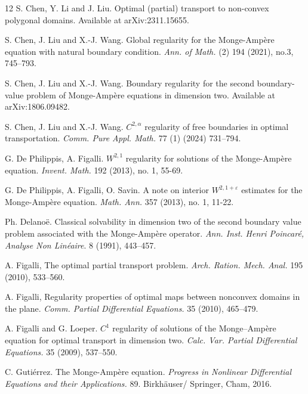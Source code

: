 \documentclass[11pt]{amsart}
\theoremstyle{plain}
\newcommand{\eps}{\varepsilon}
\newcommand{\0}{\textbf{0}}
\numberwithin{equation}{section}
\numberwithin{equation}{section}
\numberwithin{figure}{section}
\begin{document}
\begin{thebibliography}{12}
	S. Chen, Y. Li and J. Liu. Optimal (partial) transport to non-convex polygonal domains. Available at arXiv:2311.15655.
	
	S. Chen, J. Liu and X.-J. Wang. 
	Global regularity for the Monge-Amp\`ere equation with natural boundary condition. \emph{Ann. of Math.} (2) 194 (2021), no.3, 745--793.
	
	S. Chen, J. Liu and X.-J. Wang. 
	Boundary regularity for the second boundary-value problem of Monge-Amp\`ere equations in dimension two. Available at arXiv:1806.09482.
	
	S. Chen, J. Liu and X.-J. Wang.
	$C^{2,\alpha}$ regularity of free boundaries in optimal transportation.  
	\emph{Comm. Pure Appl. Math.} 77 (1) (2024) 731–794.
	
	G. De Philippis, A. Figalli.
	$W^{2,1}$ regularity for solutions of the Monge-Amp\`ere equation. \emph{Invent. Math.} 192 (2013), no. 1, 55-69.
	
	G. De Philippis, A. Figalli, O. Savin.
	A note on interior $W^{2,1+\eps}$ estimates for the Monge-Amp\`ere equation. \emph{Math. Ann.} 357 (2013), no. 1, 11-22.
	
	 Ph. Delano\"e.
	Classical solvability in dimension two of the second boundary value problem associated with the Monge-Amp\`ere operator.
	\textit{Ann. Inst. Henri Poincar\'e, Analyse Non Lin\'eaire}. 8 (1991), 443--457. 
	
	 A. Figalli, The optimal partial transport problem. 
	\textit{Arch. Ration. Mech. Anal.} 195 (2010), 533--560.
	
	
	A. Figalli, Regularity properties of optimal maps between nonconvex domains in the plane.
	\textit{Comm. Partial Differential Equations.} 35 (2010), 465--479.
	
	
	
	 A. Figalli and G. Loeper.
	$C^1$ regularity of solutions of the Monge–Amp\`ere equation for optimal transport in dimension two.
	\textit{Calc. Var. Partial Differential Equations.} 35 (2009), 537--550.
	
	 C. Guti\'errez. The Monge-Amp\`ere equation. 
	\emph{Progress in Nonlinear Differential Equations and their Applications.} 89. Birkh\"auser/ Springer, Cham, 2016. 
	

\end{thebibliography}
\end{document}
